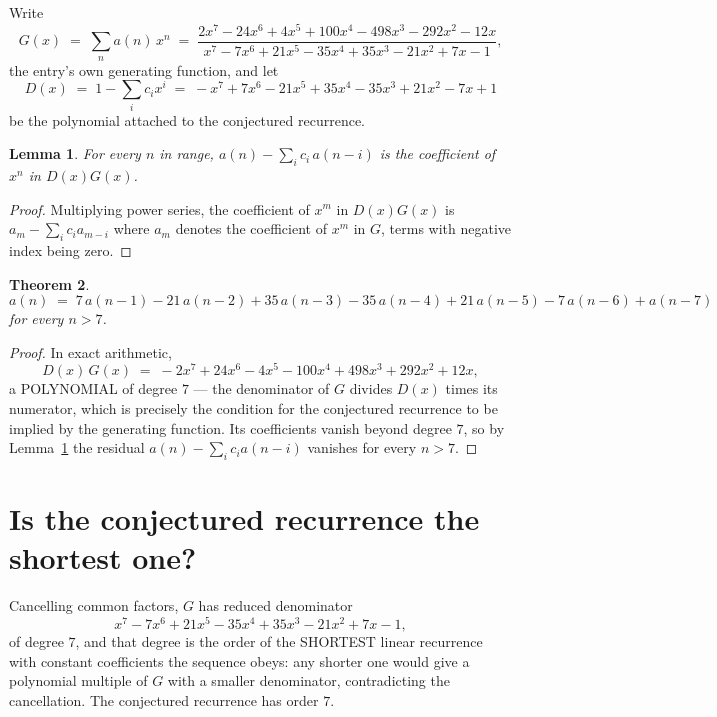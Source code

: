 \documentclass[11pt,a4paper]{article}
\theoremstyle{plain}
\newtheorem{theorem}{Theorem}
\newtheorem{lemma}[theorem]{Lemma}
\theoremstyle{definition}
\begin{document}
Write
\[
G(x)\;=\;\sum_{n}a(n)\,x^{n}\;=\;\frac{2 x^{7} - 24 x^{6} + 4 x^{5} + 100 x^{4} - 498 x^{3} - 292 x^{2} - 12 x}{x^{7} - 7 x^{6} + 21 x^{5} - 35 x^{4} + 35 x^{3} - 21 x^{2} + 7 x - 1},
\]
the entry's own generating function, and let
\[
D(x)\;=\;1-\sum_i c_i x^{i}\;=\;- x^{7} + 7 x^{6} - 21 x^{5} + 35 x^{4} - 35 x^{3} + 21 x^{2} - 7 x + 1
\]
be the polynomial attached to the conjectured recurrence.

\begin{lemma}\label{lem:key}
For every $n$ in range, $a(n)-\sum_i c_i\,a(n-i)$ is the coefficient of $x^{n}$ in
$D(x)G(x)$.
\end{lemma}

\begin{proof}
Multiplying power series, the coefficient of $x^{m}$ in $D(x)G(x)$ is
$a_m-\sum_i c_i a_{m-i}$ where $a_m$ denotes the coefficient of $x^{m}$ in $G$, terms with
negative index being zero.
\end{proof}

\begin{theorem}
\[
a(n)\;=\;7\,a(n-1) - 21\,a(n-2) + 35\,a(n-3) - 35\,a(n-4) + 21\,a(n-5) - 7\,a(n-6) + a(n-7)
\]
for every $n>7$.
\end{theorem}

\begin{proof}
In exact arithmetic,
\[
D(x)\,G(x)\;=\;- 2 x^{7} + 24 x^{6} - 4 x^{5} - 100 x^{4} + 498 x^{3} + 292 x^{2} + 12 x,
\]
a POLYNOMIAL of degree $7$ --- the denominator of $G$ divides $D(x)$ times its numerator,
which is precisely the condition for the conjectured recurrence to be implied by the
generating function. Its coefficients vanish beyond degree $7$, so by
Lemma~\ref{lem:key} the residual $a(n)-\sum_ic_ia(n-i)$ vanishes for every
$n>7$.
\end{proof}

\section{Is the conjectured recurrence the shortest one?}

Cancelling common factors, $G$ has reduced denominator
\[
x^{7} - 7 x^{6} + 21 x^{5} - 35 x^{4} + 35 x^{3} - 21 x^{2} + 7 x - 1,
\]
of degree $7$, and that degree is the order of the SHORTEST linear recurrence with
constant coefficients the sequence obeys: any shorter one would give a polynomial multiple of
$G$ with a smaller denominator, contradicting the cancellation. The conjectured recurrence has
order $7$.
\end{document}
